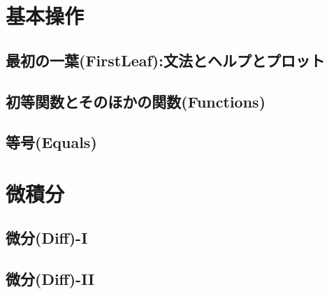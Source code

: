 \chapter{基本操作}
\section{最初の一葉(FirstLeaf):文法とヘルプとプロット}

 
 
 

 
 

 
 

 

\section{初等関数とそのほかの関数(Functions)}
 
 
 

 

 

\section{等号(Equals)}
 
 
 
 
% 
 

\chapter{微積分}
\section{微分(Diff)-I}
 
 
 
\pagebreak
\section{微分(Diff)-II}
 
 
 
 
 
 

